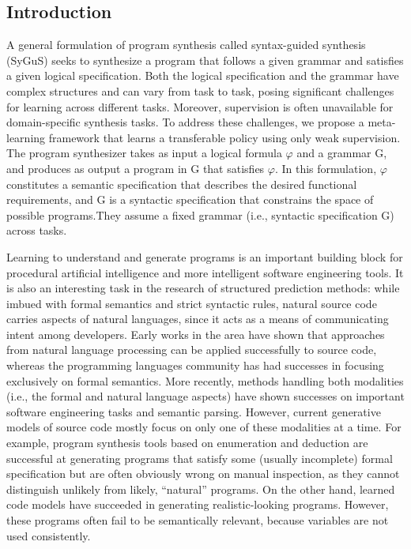 \documentclass{article}
\begin{document}
\subsection{Introduction}
A general formulation of program synthesis called syntax-guided synthesis (SyGuS) seeks to synthesize a program that follows a given grammar and satisfies a given logical specification. Both the logical specification and the grammar have complex structures and can vary from task to task, posing significant challenges for learning across different tasks. Moreover, supervision is often unavailable for domain-specific synthesis tasks. To address these challenges, we propose a meta- learning framework that learns a transferable policy using only weak supervision. The program synthesizer takes as input a logical formula $\varphi$ and a grammar G, and produces as output a program in G that satisfies $\varphi$. In this formulation, $\varphi$ constitutes a semantic specification that describes the desired functional requirements, and G is a syntactic specification that constrains the space of possible programs.They assume a fixed grammar (i.e., syntactic specification G) across tasks.

Learning to understand and generate programs is an important building block for procedural artificial intelligence and more intelligent software engineering tools. It is also an interesting task in the research of structured prediction methods: while imbued with formal semantics and strict syntactic rules, natural source code carries aspects of natural languages, since it acts as a means of communicating intent among developers. Early works in the area have shown that approaches from natural language processing can be applied successfully to source code, whereas the programming languages community has had successes in focusing exclusively on formal semantics. More recently, methods handling both modalities (i.e., the formal and natural language aspects) have shown successes on important software engineering tasks and semantic parsing. However, current generative models of source code mostly focus on only one of these modalities at a time. For example, program synthesis tools based on enumeration and deduction are successful at generating programs that satisfy some (usually incomplete) formal specification but are often obviously wrong on manual inspection, as they cannot distinguish unlikely from likely, “natural” programs. On the other hand, learned code models have succeeded in generating realistic-looking programs. However, these programs often fail to be semantically relevant, because variables are not used consistently.
\end{document}
